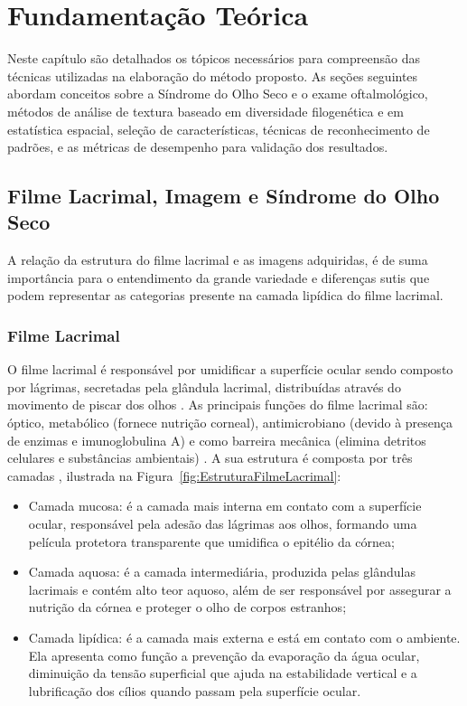 \chapter{Fundamentação Teórica}
\phantom{0}

Neste capítulo são detalhados os tópicos necessários para compreensão das técnicas utilizadas na elaboração do método proposto. As seções seguintes abordam conceitos sobre a Síndrome do Olho Seco e o exame oftalmológico, métodos de análise de textura baseado em diversidade filogenética e em estatística espacial, seleção de características, técnicas de reconhecimento de padrões, e as métricas de desempenho para validação dos resultados.

\section{Filme Lacrimal, Imagem e Síndrome do Olho Seco}

A relação da estrutura do filme lacrimal e as imagens adquiridas, é de suma importância para o entendimento da grande variedade e diferenças sutis que podem representar as categorias presente na camada lipídica do filme lacrimal.

\subsection{Filme Lacrimal}
\label{sec:filmeLacrimal}

O filme lacrimal é responsável por umidificar a superfície ocular sendo composto por lágrimas, secretadas pela glândula lacrimal, distribuídas através do movimento de piscar dos olhos \cite{remeseiro2014methodology}. As principais funções do filme lacrimal são: óptico, metabólico (fornece nutrição corneal), antimicrobiano (devido à presença de enzimas e imunoglobulina A) e como barreira mecânica (elimina detritos celulares e substâncias ambientais) \cite{dry2007definition}. A sua estrutura é composta por três camadas \cite{rolando2001ocular}, ilustrada na Figura~\ref{fig:EstruturaFilmeLacrimal}:

\begin{itemize}
    \item Camada mucosa: é a camada mais interna em contato com a superfície ocular, responsável pela adesão das lágrimas aos olhos, formando uma película protetora transparente que umidifica o epitélio da córnea;
    \item Camada aquosa: é a camada intermediária, produzida pelas glândulas lacrimais e contém alto teor aquoso, além de ser responsável por assegurar a nutrição da córnea e proteger o olho de corpos estranhos;
    \item Camada lipídica: é a camada mais externa e está em contato com o ambiente. Ela apresenta como função a prevenção da evaporação da água ocular, diminuição da tensão superficial que ajuda na estabilidade vertical e a lubrificação dos cílios quando passam pela superfície ocular.
\end{itemize}

